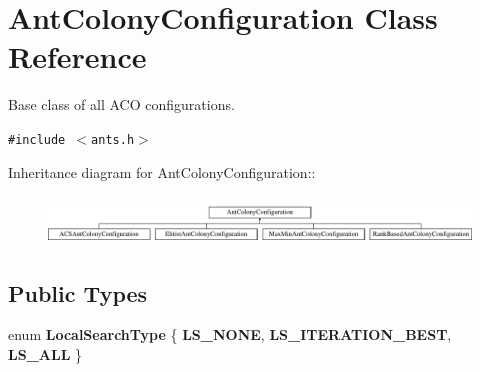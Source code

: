 \hypertarget{classAntColonyConfiguration}{
\section{AntColonyConfiguration Class Reference}
\label{classAntColonyConfiguration}
}
Base class of all ACO configurations.  


{\tt \#include $<$ants.h$>$}

Inheritance diagram for AntColonyConfiguration::\begin{figure}[H]
\begin{center}
\leavevmode
\includegraphics[height=1.2844cm]{classAntColonyConfiguration}
\end{center}
\end{figure}
\subsection*{Public Types}
\begin{CompactItemize}
\item 
enum \textbf{LocalSearchType} \{ \textbf{LS\_\-NONE}, 
\textbf{LS\_\-ITERATION\_\-BEST}, 
\textbf{LS\_\-ALL}
 \}
\end{CompactItemize}
